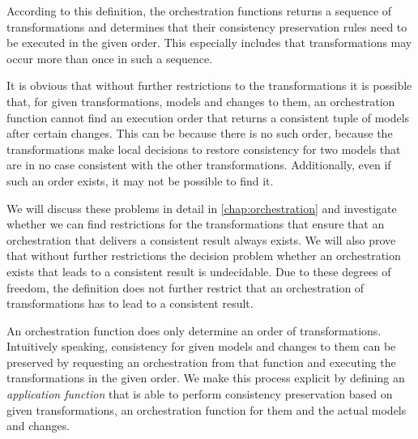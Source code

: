 According to this definition, the orchestration functions returns a sequence of transformations and determines that their consistency preservation rules need to be executed in the given order. 
This especially includes that transformations may occur more than once in such a sequence.

It is obvious that without further restrictions to the transformations it is possible that, for given transformations, models and changes to them, an orchestration function cannot find an execution order that returns a consistent tuple of models after certain changes.
This can be because there is no such order, because the transformations make local decisions to restore consistency for two models that are in no case consistent with the other transformations.
Additionally, even if such an order exists, it may not be possible to find it.



We will discuss these problems in detail in \autoref{chap:orchestration} and investigate whether we can find restrictions for the transformations that ensure that an orchestration that delivers a consistent result always exists.
We will also prove that without further restrictions the decision problem whether an orchestration exists that leads to a consistent result is undecidable.
Due to these degrees of freedom, the definition does not further restrict that an orchestration of transformations has to lead to a consistent result.

An orchestration function does only determine an order of transformations.
Intuitively speaking, consistency for given models and changes to them can be preserved by requesting an orchestration from that function and executing the transformations in the given order.
We make this process explicit by defining an \emph{application function} that is able to perform consistency preservation based on given transformations, an orchestration function for them and the actual models and changes.

